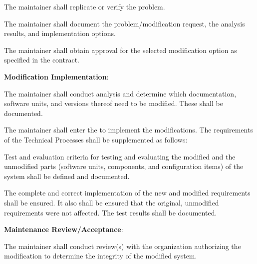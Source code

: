 \begin{adjustwidth}{2em}{0pt}
\begin{compactenum}
\begin{compactenum}
\begin{compactenum}
						\end{compactenum}

						\item The maintainer shall replicate or verify the problem.

						\item The maintainer shall document the problem/modification request, the analysis results, and implementation options.

						\item The maintainer shall obtain approval for the selected modification option as specified in the contract. 

					\end{compactenum}


					\item {\bf Modification Implementation}:

					\begin{compactenum}

						\item The maintainer shall conduct analysis and determine which documentation, software units, and versions thereof need to be modified. These shall be documented.

						\item The maintainer shall enter the  to implement the modifications. The requirements of the Technical Processes shall be supplemented as follows:

						\item Test and evaluation criteria for testing and evaluating the modified and the unmodified parts (software units, components, and configuration items) of the system shall be defined and documented.

						\item The complete and correct implementation of the new and modified requirements shall be ensured. It also shall be ensured that the original, unmodified requirements were not affected. The test results shall be documented.

					\end{compactenum}

					\item {\bf Maintenance Review/Acceptance}:

					\begin{compactenum}

						\item The maintainer shall conduct review(s) with the organization authorizing the modification to determine the integrity of the modified system.


\end{compactenum}
\end{compactenum}
\end{adjustwidth}
